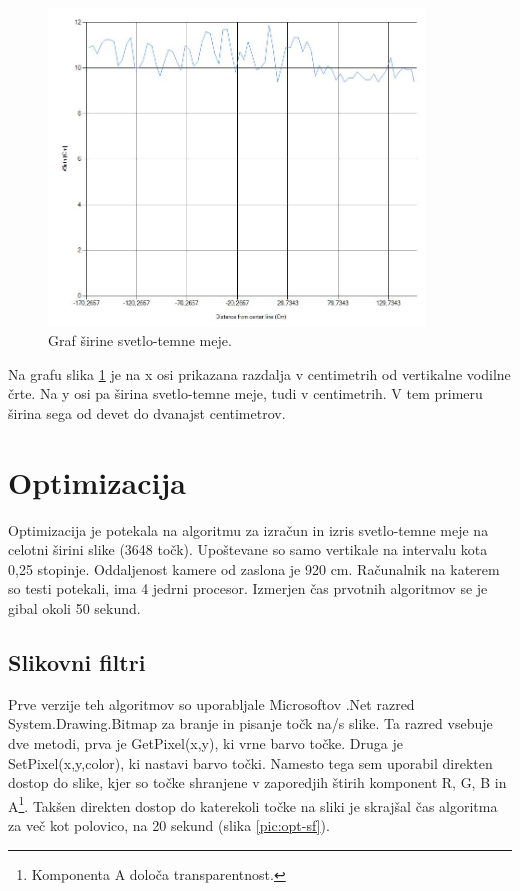 \documentclass[oneside, a4paper, 12pt]{book}
\begin{document}
\begin{figure}
\begin{center}
\includegraphics[width=10cm]{slike/graf-sirina-s-t-meja.jpg}
\end{center}
\caption{Graf širine svetlo-temne meje.}
\label{pic:st-sirina}
\end{figure}


Na grafu slika \ref{pic:st-sirina} je na x osi prikazana razdalja v centimetrih od vertikalne vodilne črte. Na y osi pa širina svetlo-temne meje, tudi v centimetrih. V tem primeru širina sega od devet do dvanajst centimetrov.


\section{Optimizacija}
Optimizacija je potekala na algoritmu za izračun in izris svetlo-temne meje na celotni širini slike (3648 točk). Upoštevane so samo vertikale na intervalu kota 0,25 stopinje. Oddaljenost kamere od zaslona je 920 cm. Računalnik na katerem so testi potekali, ima 4 jedrni procesor. Izmerjen čas prvotnih algoritmov se je gibal okoli 50 sekund.

\subsection{Slikovni filtri}
Prve verzije teh algoritmov so uporabljale Microsoftov .Net razred System.\-Drawing.\-Bitmap za branje in pisanje točk na/s slike. Ta razred vsebuje dve metodi, prva je GetPixel(x,y), ki vrne barvo točke. Druga je SetPixel(x,y,color), ki nastavi barvo točki. Namesto tega sem uporabil direkten dostop do slike, kjer so točke shranjene v zaporedjih štirih komponent R, G, B in A\footnote{Komponenta A določa transparentnost.}. Takšen direkten dostop do katerekoli točke na sliki je skrajšal čas algoritma za več kot polovico, na 20 sekund (slika \ref{pic:opt-sf}).
\end{document}
